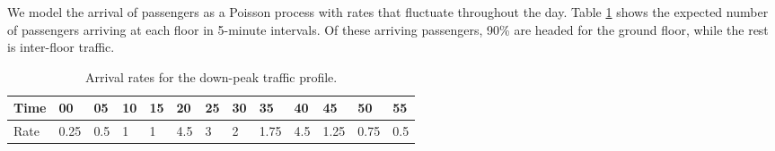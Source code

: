 We model the arrival of passengers as a Poisson process with rates that fluctuate throughout the day. Table \ref{tab:rates} shows the expected number of passengers arriving at each floor in 5-minute intervals. Of these arriving passengers, 90\% are headed for the ground floor, while the rest is inter-floor traffic. 

\begin{table}[h]
    \centering
    \caption{Arrival rates for the down-peak traffic profile.}
    \label{tab:rates}
    \begin{tabular}{@{}lllllllllllll@{}}
    \toprule
    Time & 00   & 05  & 10 & 15 & 20  & 25 & 30 & 35   & 40  & 45   & 50   & 55  \\ \midrule
    Rate & 0.25 & 0.5 & 1  & 1  & 4.5 & 3  & 2  & 1.75 & 4.5 & 1.25 & 0.75 & 0.5 \\ \bottomrule
    \end{tabular}
    \end{table}